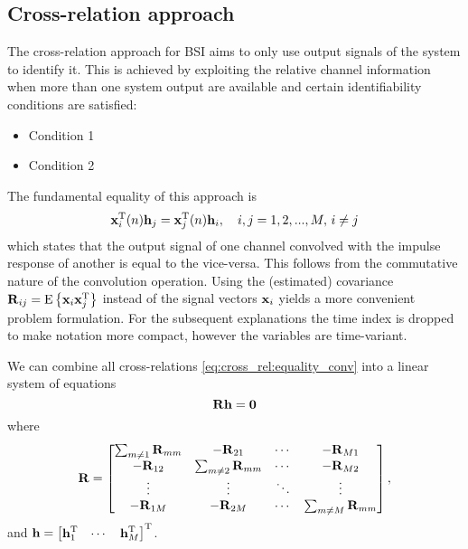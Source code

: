 \documentclass{article}
\newcommand{\h}{\mtxb{h}}
\newcommand{\x}{\mtxb{x}}
\newcommand{\R}{\mtxb{R}}
\begin{document}
\subsection{Cross-relation approach}
\label{ssec:cross_rel}
The cross-relation approach for BSI \cite{} aims to only use output signals of the system to identify it.
This is achieved by exploiting the relative channel information when more than one system output are available and certain identifiability conditions are satisfied:
\begin{itemize}
    \item Condition 1
    \item Condition 2
\end{itemize}

\noindent The fundamental equality of this approach is 
\begin{equation}
    \x_i^{\T}(n) \h_j = \x_j^{\T}(n) \h_i,\quad i,j=1,2,...,M,\,i\neq j\label{eq:cross_rel:equality_conv}
\end{equation}
which states that the output signal of one channel convolved with the impulse response of another is equal to the vice-versa.
This follows from the commutative nature of the convolution operation.
Using the (estimated) covariance \(\R_{ij} = \ev{\x_i \x_j^\T}\) instead of the signal vectors \(\x_i\) yields a more convenient problem formulation.
For the subsequent explanations the time index is dropped to make notation more compact, however the variables are time-variant.

We can combine all cross-relations \eqref{eq:cross_rel:equality_conv} into a linear system of equations
\begin{equation}
    \R \h = \bm{0} \label{eq:cross_rel:null_space}\\
\end{equation}
where 
\begin{equation}
    \R = \begin{bmatrix}
        \sum_{m \neq 1} \R_{mm} & -\R_{21} & \cdots & -\R_{M1}\\
        -\R_{12} & \sum_{m \neq 2} \R_{mm} & \cdots & -\R_{M2}\\
        \vdots & \vdots & \ddots & \vdots\\
        -\R_{1M} & -\R_{2M} & \cdots & \sum_{m \neq M} \R_{mm}\\
    \end{bmatrix},\label{eq:cross_rel:data_matrix}
\end{equation}
and \(\h = \begin{bmatrix}
    \h_1^\T & \cdots & \h_M^\T
\end{bmatrix}^\T\).
\end{document}
